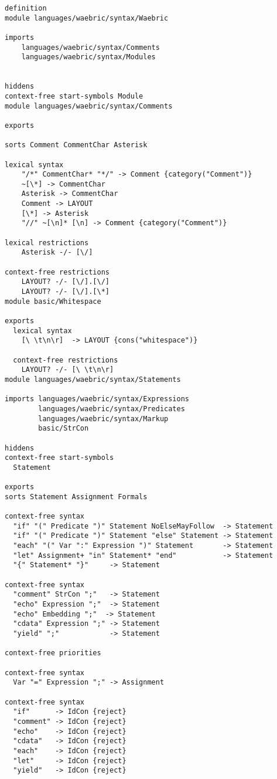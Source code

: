 \documentclass[a4paper]{article}
\begin{document}
\begin{lstlisting}[language=sdf]
definition
module languages/waebric/syntax/Waebric

imports 
	languages/waebric/syntax/Comments
	languages/waebric/syntax/Modules


hiddens
context-free start-symbols Module
module languages/waebric/syntax/Comments

exports

sorts Comment CommentChar Asterisk

lexical syntax
    "/*" CommentChar* "*/" -> Comment {category("Comment")}
    ~[\*] -> CommentChar
    Asterisk -> CommentChar
    Comment -> LAYOUT
    [\*] -> Asterisk
    "//" ~[\n]* [\n] -> Comment {category("Comment")}

lexical restrictions
    Asterisk -/- [\/]

context-free restrictions
    LAYOUT? -/- [\/].[\/]
    LAYOUT? -/- [\/].[\*]
module basic/Whitespace

exports
  lexical syntax
    [\ \t\n\r]	-> LAYOUT {cons("whitespace")}

  context-free restrictions
    LAYOUT? -/- [\ \t\n\r]
module languages/waebric/syntax/Statements

imports languages/waebric/syntax/Expressions
        languages/waebric/syntax/Predicates
        languages/waebric/syntax/Markup
        basic/StrCon

hiddens
context-free start-symbols
  Statement

exports
sorts Statement Assignment Formals

context-free syntax 
  "if" "(" Predicate ")" Statement NoElseMayFollow  -> Statement  
  "if" "(" Predicate ")" Statement "else" Statement -> Statement  
  "each" "(" Var ":" Expression ")" Statement       -> Statement  
  "let" Assignment+ "in" Statement* "end"           -> Statement  
  "{" Statement* "}"     -> Statement  

context-free syntax
  "comment" StrCon ";"   -> Statement  
  "echo" Expression ";"  -> Statement  
  "echo" Embedding ";"  -> Statement  
  "cdata" Expression ";" -> Statement  
  "yield" ";"            -> Statement  

context-free priorities

context-free syntax
  Var "=" Expression ";" -> Assignment  

context-free syntax
  "if"      -> IdCon {reject} 
  "comment" -> IdCon {reject} 
  "echo"    -> IdCon {reject} 
  "cdata"   -> IdCon {reject} 
  "each"    -> IdCon {reject} 
  "let"     -> IdCon {reject} 
  "yield"   -> IdCon {reject} 


\end{lstlisting}
\end{document}
